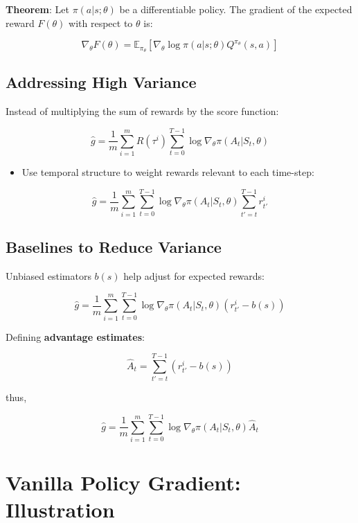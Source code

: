 \documentclass[
  letterpaper,
  DIV=11,
  numbers=noendperiod]{scrreprt}
\providecommand{\tightlist}{%
  \setlength{\itemsep}{0pt}\setlength{\parskip}{0pt}}\usepackage{longtable,booktabs,array}
\begin{document}
\textbf{Theorem}: Let \(\pi(a|s;\theta)\) be a differentiable policy.
The gradient of the expected reward \(F(\theta)\) with respect to
\(\theta\) is:

\[
\nabla_{\theta} F(\theta) = \mathbb{E}_{\pi_{\theta}} \left[\nabla_{\theta} \log \pi(a|s;\theta) Q^{\pi_{\theta}}(s, a)\right]
\]

\subsection{Addressing High Variance}\label{addressing-high-variance}

Instead of multiplying the sum of rewards by the score function:

\[
\hat{g} = \frac{1}{m} \sum^{m}_{i = 1} R(\tau^{i}) \sum^{T-1}_{t=0} \log \nabla_{\theta} \pi(A_{t}|S_{t}, \theta)
\]

\begin{itemize}
\tightlist
\item
  Use temporal structure to weight rewards relevant to each time-step:
\end{itemize}

\[
\hat{g} = \frac{1}{m} \sum^{m}_{i = 1}  \sum^{T-1}_{t=0} \log \nabla_{\theta} \pi(A_{t}|S_{t}, \theta) \sum^{T-1}_{t' = t} r^{i}_{t'}
\]

\subsection{Baselines to Reduce
Variance}\label{baselines-to-reduce-variance}

Unbiased estimators \(b(s)\) help adjust for expected rewards:

\[
\hat{g} = \frac{1}{m} \sum^{m}_{i = 1}  \sum^{T-1}_{t=0} \log \nabla_{\theta} \pi(A_{t}|S_{t}, \theta) (r^{i}_{t'} - b(s))
\]

Defining \textbf{advantage estimates}:

\[
\hat{A}_{t} = \sum^{T-1}_{t' = t} (r^{i}_{t'} - b(s))
\]

thus,

\[
\hat{g} = \frac{1}{m} \sum^{m}_{i = 1}  \sum^{T-1}_{t=0} \log \nabla_{\theta} \pi(A_{t}|S_{t}, \theta) \hat{A}_{t}
\]

\section{Vanilla Policy Gradient:
Illustration}\label{vanilla-policy-gradient-illustration}
\end{document}
